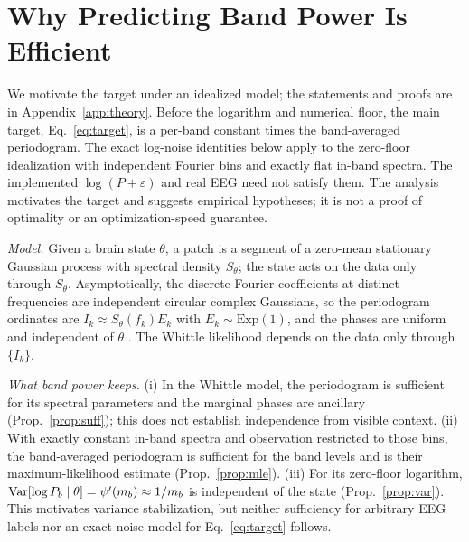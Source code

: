 \section{Why Predicting Band Power Is Efficient}\label{sec:theory}
We motivate the target under an idealized model; the statements and proofs are in
Appendix~\ref{app:theory}. Before the logarithm and numerical floor, the main target,
Eq.~\eqref{eq:target}, is a per-band constant times the band-averaged periodogram. The exact
log-noise identities below apply to the zero-floor idealization with independent Fourier bins
and exactly flat in-band spectra. The implemented $\log(P+\varepsilon)$ and real EEG need not
satisfy them. The analysis motivates the target and suggests empirical hypotheses; it is not a
proof of optimality or an optimization-speed guarantee.

\noindent\emph{Model.} Given a brain state $\theta$, a patch is a segment of a zero-mean
stationary Gaussian process with spectral density $S_\theta$; the state acts on the data only
through $S_\theta$. Asymptotically, the discrete Fourier coefficients at distinct frequencies
are independent circular complex Gaussians, so the periodogram ordinates are $I_k\approx
S_\theta(f_k)E_k$ with $E_k\sim\mathrm{Exp}(1)$, and the phases are uniform and independent of
$\theta$ \cite{brillinger1981}. The Whittle likelihood \cite{whittle1953} depends on the data
only through $\{I_k\}$.

\noindent\emph{What band power keeps.} (i) In the Whittle model, the periodogram is sufficient
for its spectral parameters and the marginal phases are ancillary (Prop.~\ref{prop:suff});
this does not establish independence from visible context. (ii) With exactly constant in-band
spectra and observation restricted to those bins, the band-averaged periodogram is sufficient
for the band levels and is their maximum-likelihood estimate (Prop.~\ref{prop:mle}). (iii)
For its zero-floor logarithm, $\operatorname{Var}[\log P_b\mid\theta]=\psi'(m_b)\approx 1/m_b$ is independent
of the state (Prop.~\ref{prop:var}). This motivates variance stabilization, but neither
sufficiency for arbitrary EEG labels nor an exact noise model for Eq.~\eqref{eq:target} follows.

